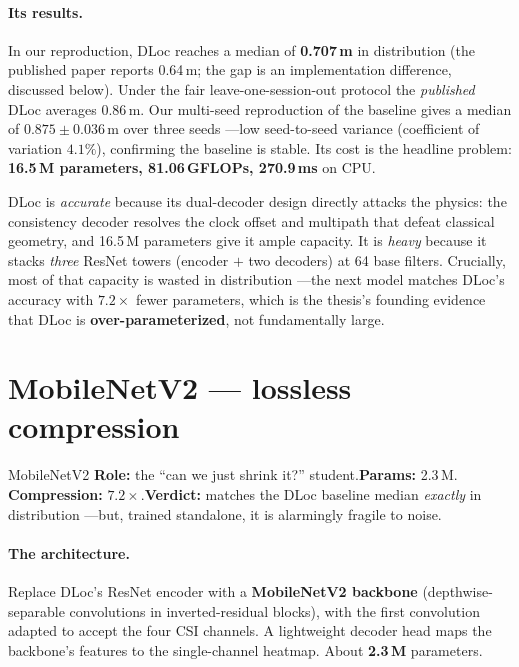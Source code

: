 \paragraph{Its results.} In our reproduction, DLoc reaches a median of \textbf{0.707\,m} in
distribution (the published paper reports 0.64\,m; the gap is an implementation difference, discussed
below). Under the fair leave-one-session-out protocol the \emph{published} DLoc averages 0.86\,m. Our
multi-seed reproduction of the baseline gives a median of $0.875 \pm 0.036$\,m over three seeds ---low
seed-to-seed variance (coefficient of variation $4.1\%$), confirming the baseline is stable. Its cost
is the headline problem: \textbf{16.5\,M parameters, 81.06\,GFLOPs, 270.9\,ms} on CPU.

\begin{whybox}
DLoc is \emph{accurate} because its dual-decoder design directly attacks the physics: the consistency
decoder resolves the clock offset and multipath that defeat classical geometry, and 16.5\,M parameters
give it ample capacity. It is \emph{heavy} because it stacks \emph{three} ResNet towers (encoder $+$
two decoders) at 64 base filters. Crucially, most of that capacity is wasted in distribution ---the
next model matches DLoc's accuracy with $7.2\times$ fewer parameters, which is the thesis's founding
evidence that DLoc is \textbf{over-parameterized}, not fundamentally large.
\end{whybox}

\section{MobileNetV2 --- lossless compression}
\label{sec:arch:mobilenet}

\begin{ataglance}{MobileNetV2}
\textbf{Role:} the ``can we just shrink it?'' student.\quad \textbf{Params:} 2.3\,M.\quad
\textbf{Compression:} $7.2\times$.\quad \textbf{Verdict:} matches the DLoc baseline median
\emph{exactly} in distribution ---but, trained standalone, it is alarmingly fragile to noise.
\end{ataglance}

\paragraph{The architecture.} Replace DLoc's ResNet encoder with a \textbf{MobileNetV2 backbone}
(depthwise-separable convolutions in inverted-residual blocks), with the first convolution adapted to
accept the four CSI channels. A lightweight decoder head maps the backbone's features to the
single-channel heatmap. About \textbf{2.3\,M} parameters.

